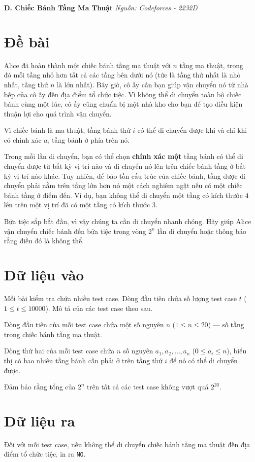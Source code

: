 \documentclass[12pt,a4paper]{article}
\newcommand{\problem}[2]{%
  \addcontentsline{toc}{section}{#1}%
  \begin{mdframed}[
    linecolor=framecolor,
    linewidth=1.5pt,
    backgroundcolor=white,
    topline=true, bottomline=true,
    leftline=true, rightline=true,
    innerleftmargin=10pt, innerrightmargin=10pt,
    innertopmargin=6pt, innerbottommargin=6pt,
  ]
  \textbf{\large #1} \hfill \textit{Nguồn: #2}
  \end{mdframed}
  \vspace{4pt}%
}
\begin{document}
\newpage
\problem{D. Chiếc Bánh Tầng Ma Thuật}{Codeforces - 2232D}

\section*{Đề bài}
Alice đã hoàn thành một chiếc bánh tầng ma thuật với $n$ tầng ma thuật, trong đó mỗi tầng nhỏ hơn tất cả các tầng bên dưới nó (tức là tầng thứ nhất là nhỏ nhất, tầng thứ $n$ là lớn nhất). Bây giờ, cô ấy cần bạn giúp vận chuyển nó từ nhà bếp của cô ấy đến địa điểm tổ chức tiệc. Vì không thể di chuyển toàn bộ chiếc bánh cùng một lúc, cô ấy cũng chuẩn bị một nhà kho cho bạn để tạo điều kiện thuận lợi cho quá trình vận chuyển.

Vì chiếc bánh là ma thuật, tầng bánh thứ $i$ có thể di chuyển được khi và chỉ khi có chính xác $a_i$ tầng bánh ở phía trên nó.

Trong mỗi lần di chuyển, bạn có thể chọn \textbf{chính xác một} tầng bánh có thể di chuyển được từ bất kỳ vị trí nào và di chuyển nó lên trên chiếc bánh tầng ở bất kỳ vị trí nào khác. Tuy nhiên, để bảo tồn cấu trúc của chiếc bánh, tầng được di chuyển phải nằm trên tầng lớn hơn nó một cách nghiêm ngặt nếu có một chiếc bánh tầng ở điểm đến. Ví dụ, bạn không thể di chuyển một tầng có kích thước $4$ lên trên một vị trí đã có một tầng có kích thước $3$.

Bữa tiệc sắp bắt đầu, vì vậy chúng ta cần di chuyển nhanh chóng. Hãy giúp Alice vận chuyển chiếc bánh đến bữa tiệc trong vòng $2^n$ lần di chuyển hoặc thông báo rằng điều đó là không thể.

\section*{Dữ liệu vào}
Mỗi bài kiểm tra chứa nhiều test case. Dòng đầu tiên chứa số lượng test case $t$ ($1 \le t \le 10000$). Mô tả của các test case theo sau.

Dòng đầu tiên của mỗi test case chứa một số nguyên $n$ ($1 \le n \le 20$) — số tầng trong chiếc bánh tầng ma thuật.

Dòng thứ hai của mỗi test case chứa $n$ số nguyên $a_1, a_2, \ldots, a_n$ ($0 \le a_i \le n$), biểu thị có bao nhiêu tầng bánh cần phải ở trên tầng thứ $i$ để nó có thể di chuyển được.

Đảm bảo rằng tổng của $2^n$ trên tất cả các test case không vượt quá $2^{20}$.

\section*{Dữ liệu ra}
Đối với mỗi test case, nếu không thể di chuyển chiếc bánh tầng ma thuật đến địa điểm tổ chức tiệc, in ra \texttt{NO}.
\end{document}
